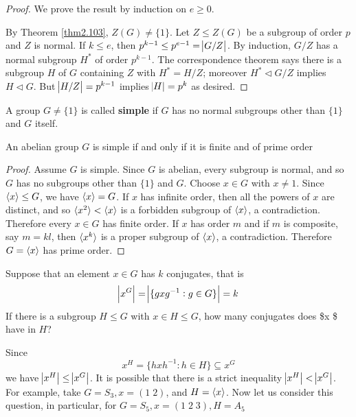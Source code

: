 \documentclass[11pt]{article}
\begin{document}
\begin{proof}
We prove the result by induction on \(e\ge 0\).

By Theorem \ref{thm2.103}, \(Z(G)\neq\{1\}\). Let \(Z\le Z(G)\) be a subgroup of order
\(p\) and \(Z\) is normal. If \(k\le e\), then \(p^{k-1}\le p^{e-1}=\abs{G/Z}\). By
induction, \(G/Z\) has a normal subgroup \(H^*\) of order \(p^{k-1}\). The
correspondence theorem says there is a subgroup \(H\) of \(G\) containing \(Z\) with
\(H^*=H/Z\); moreover \(H^*\triangleleft G/Z\)  implies \(H\triangleleft G\). But
\(\abs{H/Z}=p^{k-1}\) implies \(\abs{H}=p^k\) as desired.
\end{proof}

\begin{definition}[]
A group \(G\neq\{1\}\) is called \textbf{simple} if \(G\) has no normal subgroups other than
\(\{1\}\) and  \(G\) itself.
\end{definition}

\begin{proposition}[]
An abelian group \(G\) is simple if and only if it is finite and of prime order
\end{proposition}
\begin{proof}
Assume \(G\) is simple. Since \(G\) is abelian, every subgroup is normal, and so \(G\)
has no subgroups other than \(\{1\}\) and \(G\). Choose \(x\in G\) with \(x\neq 1\).
Since \(\langle x\rangle\le G\), we have \(\langle x\rangle =G\). If \(x\) has infinite order, then
all the powers of \(x\) are distinct, and so \(\langle x^2\rangle<\langle x\rangle\) is a forbidden
subgroup of \(\langle x\rangle\), a contradiction. Therefore every \(x\in G\) has finite
order. If \(x\) has order \(m\) and if \(m\) is composite, say \(m=kl\), then 
\(\langle x^k\rangle\) is a proper subgroup of \(\langle x\rangle\), a contradiction. Therefore
\(G=\langle x\rangle\) has prime order.
\end{proof}

Suppose that an element \(x\in G\) has \(k\) conjugates, that is 
\begin{equation*}
\abs{x^G}=\abs{\{gxg^{-1}:g\in G\}}=k
\end{equation*}
If there is a subgroup \(H\le G\) with \(x\in H\le G\), how many conjugates does \$x
\$ have in \(H\)?

Since
\begin{equation*}
x^H=\{hxh^{-1}:h\in H\}\subseteq x^G
\end{equation*}
we have \(\abs{x^H}\le\abs{x^G}\). It is possible that there is a strict
inequality \(\abs{x^H}<\abs{x^G}\). For example, take \(G=S_3,x=(1\; 2)\), and
\(H=\langle x\rangle\). Now let us consider this question, in particular, for
\(G=S_5,x=(1\;2\;3), H=A_5\)
\end{document}
